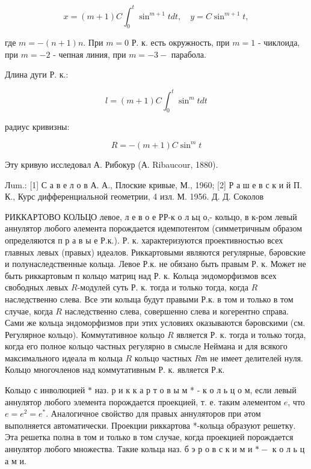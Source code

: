 \documentclass[10pt]{article}
\begin{document}
\[

x=(m+1) C \int_{0}^{t} \sin ^{m+1} t d t, \quad y=C \sin ^{m+1} t,

\]



где $m=-(n+1) n$. При $m=0$ Р. к. есть окружность, при $m=1$ - чиклоида, при $m=-2$ - чепная линия, при $m=-3-$ парабола.



Длина дуги Р. к.:



\[

l=(m+1) C \int_{0}^{t} \sin ^{m} t d t

\]



радиус кривизны:



\[

R=-(m+1) C \sin ^{m} t

\]



Эту кривую исследовал А. Рибокур (А. Ribaucour, 1880).



Лum.: [1] С а в е л о в А. А., Плоские кривые, М., 1960; [2] Р а ш е в с к и й П. К., Курс дифференциальной геометрии, 4 изл. М. 1956. Д. Д. Соколов



РИККАРТОВО КОЛЬЦО левое, л е в о е РР-к о л ьц о,- кольцо, в к-ром левый аннулятор любого әлемента порождается идемпотентом (симметричным образом определяются п р а в ы е Р.к.). Р. к. характеризуются проективностью всех главных левых (правых) идеалов. Риккартовыми являются регулярные, бәровские и полунаследственные кольца. Левое Р.к. не обязано быть правым Р. к. Может не быть риккартовым п кольцо матриц над Р. к. Кольца эндоморфизмов всех свободных левых $R$-модулей суть Р. к. тогда и только тогда, когда $R$ наследственно слева. Все эти колыца будут правыми Р.к. в том и только в том случае, когда $R$ наследственно слева, совершенно слева и когерентно справа. Сами же кольца эндоморфизмов при этих условиях оказываются бәровскими (см. Регулярное кольцо). Коммутативное кольцо $R$ является Р. к. тогда и только тогда, когда его полное кольцо частных регулярно в смысле Неймана и для всякого максимального идеала $\mathfrak{m}$ кольца $R$ кольцо частных $R \mathfrak{m}$ не имеет делителей нуля. Кольцо многочленов над коммутативным Р. к. является Р.к.



Кольцо с инволюцией $*$ наз. р и к к а р т о в ы м * - к о л ь ц о м, если левый аннулятор любого элемента порождается проекцией, т. е. таким әлементом $e$, что $e=e^{2}=e^{*}$. Аналогичное свойство для правых аннуляторов при әтом выполняется автоматически. Проекции риккартова *-кольца образуют решетку. Эта решетка полна в том и только в том случае, когда проекцией порождается аннулятор любого множества. Такие кольца наз. б э р о в с к и м и $*-$ к о л ь ц а м и.
\end{document}
